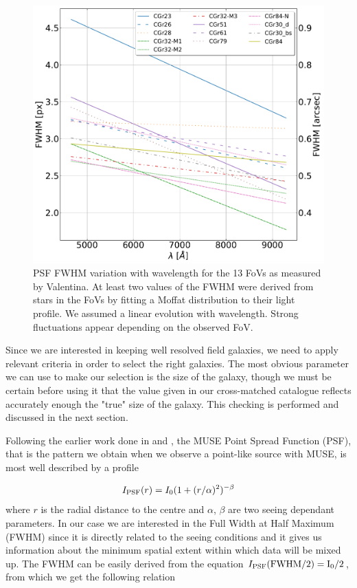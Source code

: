 \begin{figure}[t]
	\centering
	\includegraphics[width=\linewidth]{../Plots/FWHM_variation_with_lambda.pdf}
	\caption[PSF FWHM variation with wavelength.]{PSF FWHM variation with wavelength for the 13 FoVs as measured by Valentina. At least two values of the FWHM were derived from stars in the FoVs by fitting a Moffat distribution to their light profile. We assumed a linear evolution with wavelength. Strong fluctuations appear depending on the observed FoV.}
	\label{fig:FWHM_var_lambda}
\end{figure}

Since we are interested in keeping well resolved field galaxies, we need to apply relevant criteria in order to select the right galaxies. The most obvious parameter we can use to make our selection is the size of the galaxy, though we must be certain before using it that the value given in our cross-matched catalogue reflects accurately enough the "true" size of the galaxy. This checking is performed and discussed in the next section.

Following the earlier work done in  and , the MUSE Point Spread Function (PSF), that is the pattern we obtain when we observe a point-like source with MUSE, is most well described by a  profile

\begin{equation}
	I_{\rm{PSF}}(r) = I_0 (1 + (r/\alpha)^2 ) ^{- \beta}
\end{equation}
where $r$ is the radial distance to the centre and $\alpha$, $\beta$ are two seeing dependant parameters. In our case we are interested in the Full Width at Half Maximum (FWHM) since it is directly related to the seeing conditions and it gives us information about the minimum spatial extent within which data will be mixed up.
The FWHM can be easily derived from the equation $I_{\rm{PSF}} ( \rm{FWHM}/2) = I_0 /2$, from which we get the following relation


